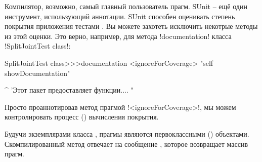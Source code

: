 \documentclass[a4paper,10pt,twoside]{book}
\begin{document}
{%
Компилятор, возможно, самый главный пользователь прагм. SUnit -- ещё один инструмент, использующий аннотации. SUnit способен оценивать степень покрытия приложения тестами . Вы можете захотеть исключить некотрые методы из этой оценки. Это верно, например, для метода \ct!documentation! класса \ct!SplitJointTest class!:

\begin{code}{}
SplitJointTest class>>>documentation
	<ignoreForCoverage>
	"self showDocumentation"
	
	^ 'Этот пакет предоставляет функции.... "
\end{code}

Просто проаннотировав метод прагмой \ct!<ignoreForCoverage>!, мы можем контролировать процесс () вычисления покрытия.


%	


Будучи экземплярами класса , прагмы являются первоклассными () объектами. Скомпилированный метод отвечает на сообщение , которое возвращает массив прагм.

}
\end{document}
